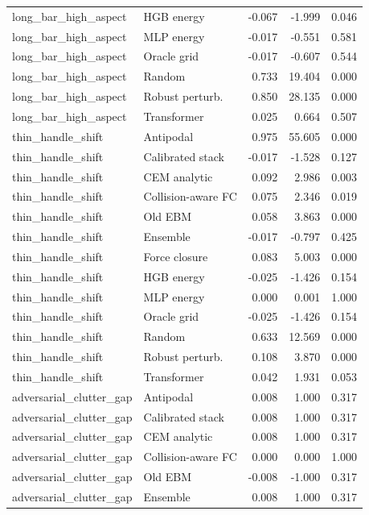 {\begin{longtable}{llrrr}
long\_bar\_high\_aspect & HGB energy & -0.067 & -1.999 & 0.046 \\
long\_bar\_high\_aspect & MLP energy & -0.017 & -0.551 & 0.581 \\
long\_bar\_high\_aspect & Oracle grid & -0.017 & -0.607 & 0.544 \\
long\_bar\_high\_aspect & Random & 0.733 & 19.404 & 0.000 \\
long\_bar\_high\_aspect & Robust perturb. & 0.850 & 28.135 & 0.000 \\
long\_bar\_high\_aspect & Transformer & 0.025 & 0.664 & 0.507 \\
thin\_handle\_shift & Antipodal & 0.975 & 55.605 & 0.000 \\
thin\_handle\_shift & Calibrated stack & -0.017 & -1.528 & 0.127 \\
thin\_handle\_shift & CEM analytic & 0.092 & 2.986 & 0.003 \\
thin\_handle\_shift & Collision-aware FC & 0.075 & 2.346 & 0.019 \\
thin\_handle\_shift & Old EBM & 0.058 & 3.863 & 0.000 \\
thin\_handle\_shift & Ensemble & -0.017 & -0.797 & 0.425 \\
thin\_handle\_shift & Force closure & 0.083 & 5.003 & 0.000 \\
thin\_handle\_shift & HGB energy & -0.025 & -1.426 & 0.154 \\
thin\_handle\_shift & MLP energy & 0.000 & 0.001 & 1.000 \\
thin\_handle\_shift & Oracle grid & -0.025 & -1.426 & 0.154 \\
thin\_handle\_shift & Random & 0.633 & 12.569 & 0.000 \\
thin\_handle\_shift & Robust perturb. & 0.108 & 3.870 & 0.000 \\
thin\_handle\_shift & Transformer & 0.042 & 1.931 & 0.053 \\
adversarial\_clutter\_gap & Antipodal & 0.008 & 1.000 & 0.317 \\
adversarial\_clutter\_gap & Calibrated stack & 0.008 & 1.000 & 0.317 \\
adversarial\_clutter\_gap & CEM analytic & 0.008 & 1.000 & 0.317 \\
adversarial\_clutter\_gap & Collision-aware FC & 0.000 & 0.000 & 1.000 \\
adversarial\_clutter\_gap & Old EBM & -0.008 & -1.000 & 0.317 \\
adversarial\_clutter\_gap & Ensemble & 0.008 & 1.000 & 0.317 \\

\end{longtable}}
